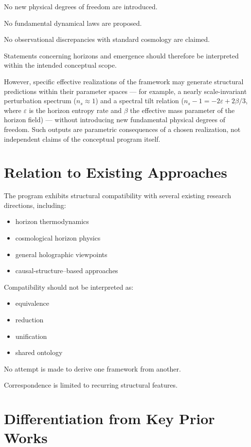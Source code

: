 \documentclass[12pt,a4paper]{article}
\begin{document}
No new physical degrees of freedom are introduced.

No fundamental dynamical laws are proposed.

No observational discrepancies with standard cosmology are claimed.

Statements concerning horizons and emergence should therefore be interpreted within the intended conceptual scope.

However, specific effective realizations of the framework may generate structural predictions within their parameter spaces --- for example, a nearly scale-invariant perturbation spectrum ($n_s \approx 1$) and a spectral tilt relation ($n_s - 1 = -2\varepsilon + 2\beta/3$, where $\varepsilon$ is the horizon entropy rate and $\beta$ the effective mass parameter of the horizon field) --- without introducing new fundamental physical degrees of freedom. Such outputs are parametric consequences of a chosen realization, not independent claims of the conceptual program itself.

\section{Relation to Existing Approaches}

The program exhibits structural compatibility with several existing research directions, including:

\begin{itemize}
  \item horizon thermodynamics
  \item cosmological horizon physics
  \item general holographic viewpoints
  \item causal-structure--based approaches
\end{itemize}

Compatibility should not be interpreted as:

\begin{itemize}
  \item equivalence
  \item reduction
  \item unification
  \item shared ontology
\end{itemize}

No attempt is made to derive one framework from another.

Correspondence is limited to recurring structural features.

\section{Differentiation from Key Prior Works}
\end{document}
